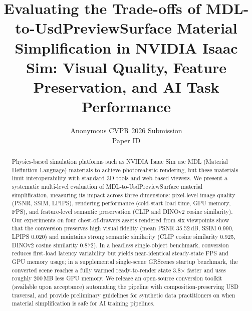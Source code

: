 \documentclass[10pt,twocolumn,letterpaper]{article}
\title{Evaluating the Trade-offs of MDL-to-UsdPreviewSurface Material
Simplification in NVIDIA Isaac Sim: Visual Quality, Feature Preservation,
and AI Task Performance}
\author{Anonymous CVPR 2026 Submission\\
Paper ID \cvprPaperID}
\begin{document}
\maketitle

\begin{abstract}
Physics-based simulation platforms such as NVIDIA Isaac Sim use MDL (Material
Definition Language) materials to achieve photorealistic rendering, but these
materials limit interoperability with standard 3D tools and web-based viewers.
We present a systematic multi-level evaluation of MDL-to-UsdPreviewSurface material
simplification, measuring its impact across three dimensions: pixel-level image
quality (PSNR, SSIM, LPIPS), rendering performance (cold-start load time, GPU memory, FPS),
and feature-level semantic preservation (CLIP and DINOv2 cosine similarity). Our
experiments on four chest-of-drawers assets rendered from six viewpoints show
that the conversion preserves high visual fidelity (mean PSNR 35.52\,dB, SSIM
0.990, LPIPS 0.020) and maintains strong semantic similarity (CLIP cosine
similarity 0.925, DINOv2 cosine similarity 0.872). In a headless single-object benchmark, conversion reduces
first-load latency variability but yields near-identical steady-state FPS and
GPU memory usage; in a supplemental single-scene GRScenes startup benchmark, the
converted scene reaches a fully warmed ready-to-render state 3.8$\times$
faster and uses roughly 200\,MB less GPU memory. We
release an open-source conversion toolkit (available upon acceptance) automating the pipeline with
composition-preserving USD traversal, and provide preliminary guidelines for
synthetic data practitioners on when material simplification is safe for AI
training pipelines.
\end{abstract}








{\small


}
\end{document}
